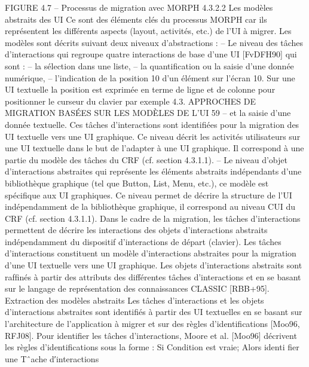 \documentclass{article}
\begin{document}
 
FIGURE 4.7 – Processus de migration avec MORPH
4.3.2.2
Les mod\`{e}les abstraits des UI
Ce sont des \'{e}l\'{e}ments cl\'{e}s du processus MORPH car ils repr\'{e}sentent les diff\'{e}rents aspects (layout,
activit\'{e}s, etc.) de l’UI \`{a} migrer. Les mod\`{e}les sont d\'{e}crits suivant deux niveaux d’abstractions :
– Le niveau des t\^{a}ches d’interactions qui regroupe quatre interactions de base d’une UI
[FvDFH90] qui sont :
– la s\'{e}lection dans une liste,
– la quantiﬁcation ou la saisie d’une donn\'{e}e num\'{e}rique,
– l’indication de la position 10 d’un \'{e}l\'{e}ment sur l’\'{e}cran
10. Sur une UI textuelle la position est exprim\'{e}e en terme de ligne et de colonne pour positionner le curseur du clavier
par exemple
4.3. APPROCHES DE MIGRATION BASÉES SUR LES MODÈLES DE L’UI
59
– et la saisie d’une donn\'{e}e textuelle.
Ces t\^{a}ches d’interactions sont identiﬁ\'{e}es pour la migration des UI textuelle vers une UI graphique. Ce niveau d\'{e}crit les activit\'{e}s utilisateurs sur une UI textuelle dans le but de l’adapter \`{a}
une UI graphique. Il correspond \`{a} une partie du mod\`{e}le des t\^{a}ches du CRF (cf. section 4.3.1.1).
– Le niveau d’objet d’interactions abstraites qui repr\'{e}sente les \'{e}l\'{e}ments abstraits ind\'{e}pendants
d’une biblioth\`{e}que graphique (tel que Button, List, Menu, etc.), ce mod\`{e}le est sp\'{e}ciﬁque aux UI
graphiques. Ce niveau permet de d\'{e}crire la structure de l’UI ind\'{e}pendamment de la biblioth\`{e}que
graphique, il correspond au niveau CUI du CRF (cf. section 4.3.1.1).
Dans le cadre de la migration, les t\^{a}ches d’interactions permettent de d\'{e}crire les interactions des
objets d’interactions abstraits ind\'{e}pendamment du dispositif d’interactions de d\'{e}part (clavier).
Les t\^{a}ches d’interactions constituent un mod\`{e}le d’interactions abstraites pour la migration d’une
UI textuelle vers une UI graphique.
Les objets d’interactions abstraits sont rafﬁn\'{e}s \`{a} partir des attributs des diff\'{e}rentes t\^{a}ches d’interactions et en se basant sur le langage de repr\'{e}sentation des connaissances CLASSIC [RBB+95].
Extraction des mod\`{e}les abstraits
Les t\^{a}ches d’interactions et les objets d’interactions abstraites
sont identiﬁ\'{e}s \`{a} partir des UI textuelles en se basant sur l’architecture de l’application \`{a} migrer et
sur des r\`{e}gles d’identiﬁcations [Moo96, RFJ08]. Pour identiﬁer les t\^{a}ches d’interactions, Moore et
al. [Moo96] d\'{e}crivent les r\`{e}gles d’identiﬁcations sous la forme :
Si Condition est vraie; Alors identi fier une Tˆache d′interactions
\end{document}
